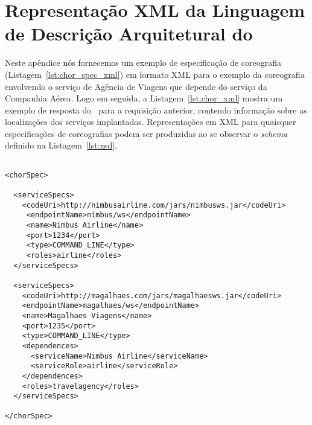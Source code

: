 \chapter{Representação XML da Linguagem de Descrição Arquitetural do \ee}
\label{ape:xml}

Neste apêndice nós fornecemos um exemplo de especificação de coreografia (Listagem~\ref{lst:chor_spec_xml}) em formato XML para o exemplo da coreografia envolvendo o serviço de Agência de Viagens que depende do serviço da Companhia Aérea. Logo em seguida, a Listagem~\ref{lst:chor_xml} mostra um exemplo de resposta do \ee\ para a requisição anterior, contendo informação sobre as localizações dos serviços implantados. Representações em XML para quaisquer especificações de coreografias podem ser produzidas ao se observar o \emph{schema} definido na Listagem~\ref{lst:xsd}.

\lstset{language=XML}

{\footnotesize
\begin{lstlisting}[frame=trbl, label=lst:chor_spec_xml, caption=Exemplo de representação XML da classe \textsf{ChorSpec}]

<chorSpec>

  <serviceSpecs>
    <codeUri>http://nimbusairline.com/jars/nimbusws.jar</codeUri>
     <endpointName>nimbus/ws</endpointName>
     <name>Nimbus Airline</name>
     <port>1234</port>
     <type>COMMAND_LINE</type>
     <roles>airline</roles>
  </serviceSpecs>
  
  <serviceSpecs>
    <codeUri>http://magalhaes.com/jars/magalhaesws.jar</codeUri>
    <endpointName>magalhaes/ws</endpointName>
    <name>Magalhaes Viagens</name>
    <port>1235</port>
    <type>COMMAND_LINE</type>
    <dependences>
      <serviceName>Nimbus Airline</serviceName>
      <serviceRole>airline</serviceRole>
    </dependences>
    <roles>travelagency</roles>
  </serviceSpecs>
  
</chorSpec>
\end{lstlisting}
}


